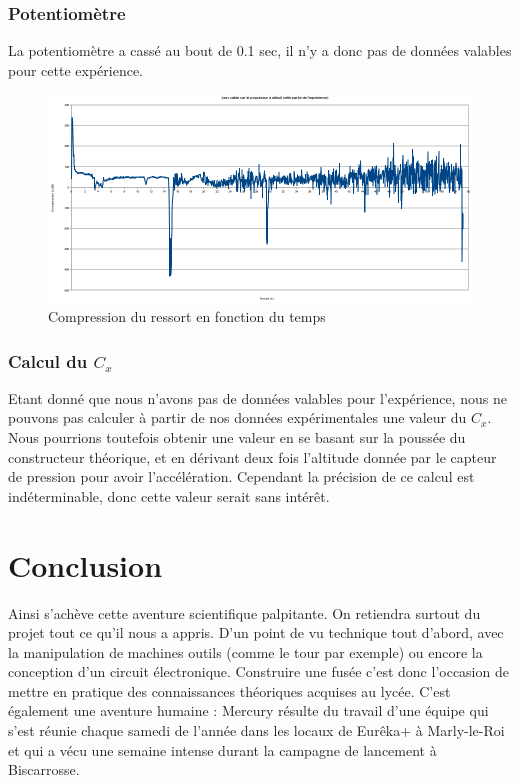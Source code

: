 \documentclass[a4paper,12pt]{scrartcl}
\begin{document}
	  \subsubsection{Potentiomètre}
	  La potentiomètre a cassé au bout de 0.1 sec, il n'y a donc pas de données valables pour cette expérience.
	  \begin{figure}[H]
		\begin{center}
		    \caption{ Compression du ressort en fonction du temps }
		    \includegraphics[height=208px, width=424px]{analyse/compression-ressort.png}
		\end{center}
	  \end{figure}		 
	  \subsubsection{Calcul du $C_x$}
	  Etant donné que nous n'avons pas de données valables pour l'expérience, nous ne pouvons pas calculer à partir de nos données expérimentales une valeur du $C_x$.
	  Nous pourrions toutefois obtenir une valeur en se basant sur la poussée du constructeur théorique, et en dérivant deux fois l'altitude donnée par le capteur de pression pour avoir l'accélération.
	  Cependant la précision de ce calcul est indéterminable, donc cette valeur serait sans intérêt.
	 \newpage
	  \section{Conclusion}
	  
	  Ainsi s'achève cette aventure scientifique palpitante. On retiendra surtout du projet tout ce qu'il nous a appris.
	  D'un point de vu technique tout d'abord, avec la manipulation de machines outils (comme le tour par exemple) ou encore la conception d'un circuit électronique.
	  Construire une fusée c'est donc l'occasion de mettre en pratique des connaissances théoriques acquises au lycée.
	  C'est également une aventure humaine : Mercury résulte du travail d'une équipe qui s'est réunie chaque samedi de l'année dans les locaux de Eurêka+ à Marly-le-Roi et qui a vécu une semaine intense durant la campagne de lancement à Biscarrosse.
	  
\end{document}
